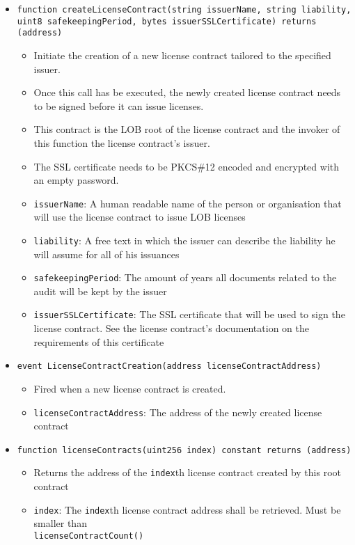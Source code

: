 \documentclass[a4paper]{article}
\begin{document}
\begin{itemize}
  \item \texttt{function createLicenseContract(string issuerName, string liability, \\uint8 safekeepingPeriod, bytes issuerSSLCertificate) returns (address)}
  \begin{itemize}
    \item Initiate the creation of a new license contract tailored to the specified issuer. 
    \item Once this call has be executed, the newly created license contract needs to be signed before it can issue licenses.
    \item This contract is the LOB root of the license contract and the invoker of this function the license contract's issuer.
    \item The SSL certificate needs to be PKCS\#12 encoded and encrypted with an empty password.
    \item \texttt{issuerName}: A human readable name of the person or organisation that will use the license contract to issue LOB licenses
    \item \texttt{liability}: A free text in which the issuer can describe the liability he will assume for all of his issuances
    \item \texttt{safekeepingPeriod}: The amount of years all documents related to the audit will be kept by the issuer
    \item \texttt{issuerSSLCertificate}: The SSL certificate that will be used to sign the license contract. See the license contract's documentation on the requirements of this certificate
  \end{itemize}
    
  \item \texttt{event LicenseContractCreation(address licenseContractAddress)}
  \begin{itemize}
    \item Fired when a new license contract is created.
    \item \texttt{licenseContractAddress}: The address of the newly created license contract
  \end{itemize}
  
  \item \texttt{function licenseContracts(uint256 index) constant returns (address)}
  \begin{itemize}
    \item Returns the address of the \texttt{index}th license contract created by this root contract
    \item \texttt{index}: The \texttt{index}th license contract address shall be retrieved. Must be smaller than \\\texttt{licenseContractCount()}
  \end{itemize}


\end{itemize}
\end{document}
